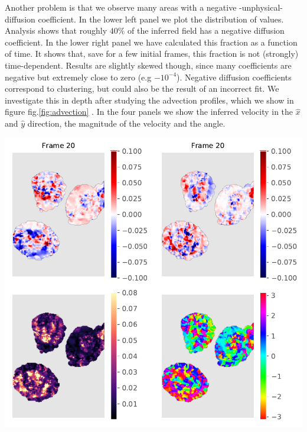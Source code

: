 \documentclass[12pt,a4paper,]{Dissertate}
\let\origfigure\figure
\let\endorigfigure\endfigure
\renewenvironment{figure}[1][2] {
    \expandafter\origfigure\expandafter[H]
} {
    \endorigfigure
}
\begin{document}
Another problem is that we observe many areas with a negative
-unphysical- diffusion coefficient. In the lower left panel we plot the
distribution of values. Analysis shows that roughly \(40\%\) of the
inferred field has a negative diffusion coefficient. In the lower right
panel we have calculated this fraction as a function of time. It shows
that, save for a few initial frames, this fraction is not (strongly)
time-dependent. Results are slightly skewed though, since many
coefficients are negative but extremely close to zero (e.g
\(-10^{-4}\)). Negative diffusion coefficients correspond to clustering,
but could also be the result of an incorrect fit. We investigate this in
depth after studying the advection profiles, which we show in figure
fig.\ref{fig:advection} . In the four panels we show the inferred
velocity in the \(\hat{x}\) and \(\hat{y}\) direction, the magnitude of
the velocity and the angle.

\begin{figure}
\hypertarget{fig:advection}{%
\centering
\includegraphics{source/figures/pdf/Fit_LSconstrainedadvection.pdf}
\caption{Analysis of the velocity fields. The upper rows show
respectively \(v_x\) and \(v_y\), wwhile the lower row shows the
magnitude and angle.}\label{fig:advection}
}
\end{figure}
\end{document}
